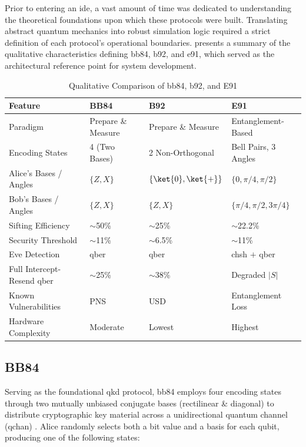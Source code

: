 Prior to entering an \gls{ide}, a vast amount of time was dedicated to understanding the theoretical foundations upon which these protocols were built. Translating abstract quantum mechanics into robust simulation logic required a strict definition of each protocol's operational boundaries.  presents a summary of the qualitative characteristics defining \gls{bb84}, \gls{b92}, and \gls{e91}, which served as the architectural reference point for system development.

\begin{table}[h]
\centering
\caption{Qualitative Comparison of \gls{bb84}, \gls{b92}, and E91}
\label{tab:protocol-comparison}
\footnotesize
\begin{tabularx}{\linewidth}{@{}l X X X@{}}
\toprule
\textbf{Feature} & \textbf{BB84} & \textbf{B92} & \textbf{E91} \\
\midrule
Paradigm & Prepare \& Measure & Prepare \& Measure & Entanglement-Based \\
Encoding States & 4 (Two Bases) & 2 Non-Orthogonal & Bell Pairs, 3 Angles \\
Alice's Bases / Angles & $\{Z, X\}$ & $\{\ket{0}, \ket{+}\}$ & $\{0, \pi/4, \pi/2\}$ \\
Bob's Bases / Angles & $\{Z, X\}$ & $\{Z, X\}$ & $\{\pi/4, \pi/2, 3\pi/4\}$ \\
Sifting Efficiency & $\sim$50\% & $\sim$25\% & $\sim$22.2\% \\
Security Threshold & $\sim$11\% & $\sim$6.5\% & $\sim$11\% \\
Eve Detection & \gls{qber} & \gls{qber} & \gls{chsh} $+$ \gls{qber} \\
Full Intercept-Resend \gls{qber} & $\sim$25\% & $\sim$38\% & Degraded $|S|$ \\
Known Vulnerabilities & PNS & USD & Entanglement Loss \\
Hardware Complexity & Moderate & Lowest & Highest \\
\bottomrule
\end{tabularx}
\end{table}

\subsection{BB84}
\label{subsec:bb84}

Serving as the foundational \gls{qkd} protocol, \gls{bb84} employs four encoding states through two mutually unbiased conjugate bases (rectilinear \& diagonal) to distribute cryptographic key material across a unidirectional quantum channel (\gls{qchan}) \cite{BB84}. Alice randomly selects both a bit value and a basis for each qubit, producing one of the following states:

